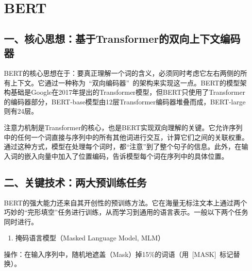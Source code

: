 \setcounter{section}{4}

\hypertarget{bert}{%
\section{BERT}\label{bert}}

\hypertarget{ux4e00ux6838ux5fc3ux601dux60f3ux57faux4e8etransformerux7684ux53ccux5411ux4e0aux4e0bux6587ux7f16ux7801ux5668}{%
\subsection{一、核心思想：基于Transformer的双向上下文编码器}\label{ux4e00ux6838ux5fc3ux601dux60f3ux57faux4e8etransformerux7684ux53ccux5411ux4e0aux4e0bux6587ux7f16ux7801ux5668}}

BERT的核心思想在于：要真正理解一个词的含义，必须同时考虑它左右两侧的所有上下文。它通过一种称为~``双向编码器''~的架构来实现这一点。BERT的模型架构基础是Google在2017年提出的Transformer模型，但BERT只使用了Transformer的编码器部分，BERT-base模型由12层Transformer编码器堆叠而成，BERT-large则有24层。

注意力机制是Transformer的核心，也是BERT实现双向理解的关键。它允许序列中的任何一个词直接与序列中的所有其他词进行交互，计算它们之间的关联权重。通过这种方式，模型在处理每个词时，都``注意''到了整个句子的信息。此外，在输入词的嵌入向量中加入了位置编码，告诉模型每个词在序列中的具体位置。

\hypertarget{ux4e8cux5173ux952eux6280ux672fux4e24ux5927ux9884ux8badux7ec3ux4efbux52a1}{%
\subsection{二、关键技术：两大预训练任务}\label{ux4e8cux5173ux952eux6280ux672fux4e24ux5927ux9884ux8badux7ec3ux4efbux52a1}}

BERT的强大能力还来自其开创性的预训练方法。它在海量无标注文本上通过两个巧妙的``完形填空''任务进行训练，从而学习到通用的语言表示。一般以下两个任务同时进行。

\begin{enumerate}
\def\labelenumi{\arabic{enumi}.}
\tightlist
\item
  掩码语言模型（Masked Language Model, MLM）
\end{enumerate}

操作：在输入序列中，随机地遮盖（Mask）掉15\%的词语（用~{[}MASK{]}~标记替换）。

